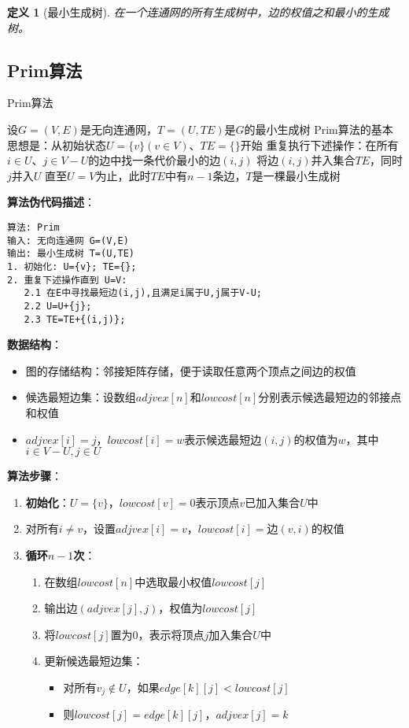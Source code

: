 \documentclass[12pt,a4paper]{amsart}
\newtheorem{definition}{定义}[section]
\begin{document}
\begin{definition}[最小生成树]
在一个连通网的所有生成树中，边的权值之和最小的生成树。
\end{definition}

\subsection{Prim算法}

\begin{algorithm}[H]
\caption{Prim算法}
\begin{algorithmic}[1]
\STATE 设$G=(V,E)$是无向连通网，$T=(U,TE)$是$G$的最小生成树
\STATE Prim算法的基本思想是：从初始状态$U=\{v\}(v \in V)$、$TE=\{\}$开始
\STATE 重复执行下述操作：在所有$i \in U$、$j \in V-U$的边中找一条代价最小的边$(i,j)$
\STATE 将边$(i,j)$并入集合$TE$，同时$j$并入$U$
\STATE 直至$U=V$为止，此时$TE$中有$n-1$条边，$T$是一棵最小生成树
\end{algorithmic}
\end{algorithm}

\textbf{算法伪代码描述}：
\begin{verbatim}
算法: Prim
输入: 无向连通网 G=(V,E)
输出: 最小生成树 T=(U,TE)
1. 初始化: U={v}; TE={};
2. 重复下述操作直到 U=V:
   2.1 在E中寻找最短边(i,j),且满足i属于U,j属于V-U;
   2.2 U=U+{j};
   2.3 TE=TE+{(i,j)};
\end{verbatim}

\textbf{数据结构}：
\begin{itemize}
    \item 图的存储结构：邻接矩阵存储，便于读取任意两个顶点之间边的权值
    \item 候选最短边集：设数组$adjvex[n]$和$lowcost[n]$分别表示候选最短边的邻接点和权值
    \item $adjvex[i]=j$，$lowcost[i]=w$表示候选最短边$(i,j)$的权值为$w$，其中$i \in V-U, j \in U$
\end{itemize}

\textbf{算法步骤}：
\begin{enumerate}
    \item \textbf{初始化}：$U=\{v\}$，$lowcost[v]=0$表示顶点$v$已加入集合$U$中
    \item 对所有$i \neq v$，设置$adjvex[i]=v$，$lowcost[i]=$边$(v,i)$的权值
    \item \textbf{循环$n-1$次}：
    \begin{enumerate}
        \item 在数组$lowcost[n]$中选取最小权值$lowcost[j]$
        \item 输出边$(adjvex[j], j)$，权值为$lowcost[j]$  
        \item 将$lowcost[j]$置为0，表示将顶点$j$加入集合$U$中
        \item 更新候选最短边集：
        \begin{itemize}
            \item 对所有$v_j \notin U$，如果$edge[k][j] < lowcost[j]$
            \item 则$lowcost[j] = edge[k][j]$，$adjvex[j] = k$
        \end{itemize}
    \end{enumerate}
\end{enumerate}
\end{document}
